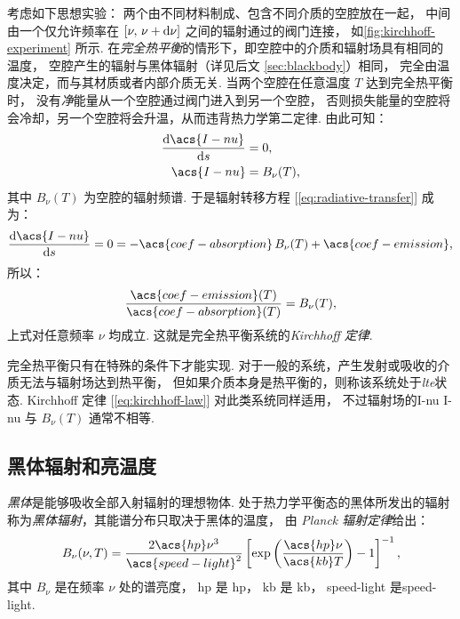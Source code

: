 考虑如下思想实验：
两个由不同材料制成、包含不同介质的空腔放在一起，
中间由一个仅允许频率在 $[\nu, \,\nu+\mathrm{d}\nu]$ 之间的辐射通过的阀门连接，
如\autoref{fig:kirchhoff-experiment} 所示.
在\emph{完全热平衡}的情形下，即空腔中的介质和辐射场具有相同的温度，
空腔产生的辐射与黑体辐射（详见后文 \autoref{sec:blackbody}）相同，
完全由温度决定，而与其材质或者内部介质无关.
当两个空腔在任意温度 $T$ 达到完全热平衡时，
没有\emph{净}能量从一个空腔通过阀门进入到另一个空腔，
否则损失能量的空腔将会冷却，另一个空腔将会升温，从而违背热力学第二定律.
由此可知：
\begin{align}
  \diff{\acs{I-nu}}{s} & = 0 , \\
  \acs{I-nu} & = B_{\nu}(T) ,
\end{align}
其中 $B_{\nu}(T)$ 为空腔的辐射频谱.
于是辐射转移方程 [\autoref{eq:radiative-transfer}] 成为：
\begin{equation}
  \diff{\acs{I-nu}}{s} = 0
    = - \acs{coef-absorption} \,B_{\nu}(T) + \acs{coef-emission} ,
\end{equation}
所以：
\begin{equation}
  \label{eq:kirchhoff-law}
  \frac{\acs{coef-emission}(T)}{\acs{coef-absorption}(T)} = B_{\nu}(T) ,
\end{equation}
上式对任意频率 $\nu$ 均成立.
这就是完全热平衡系统的\emph{Kirchhoff 定律}.

完全热平衡只有在特殊的条件下才能实现.
对于一般的系统，产生发射或吸收的介质无法与辐射场达到热平衡，
但如果介质本身是热平衡的，则称该系统处于\emph{\acf{lte}}状态.
Kirchhoff 定律 [\autoref{eq:kirchhoff-law}] 对此类系统同样适用，
不过辐射场的\acl{I-nu} \ac{I-nu} 与 $B_{\nu}(T)$ 通常不相等.

\subsection{黑体辐射和亮温度}
\label{sec:blackbody}

\emph{黑体}是能够吸收全部入射辐射的理想物体.
处于热力学平衡态的黑体所发出的辐射称为\emph{黑体辐射}，其能谱分布只取决于黑体的温度，
由 \emph{Planck 辐射定律}给出：
\begin{equation}
  \label{eq:planck}
  B_{\nu}(\nu, T) = \frac{2 \acs{hp} \nu^3}{\acs{speed-light}^2}
    \left[ \exp\left( \frac{\acs{hp} \nu}{\acs{kb} T} \right) - 1 \right]^{-1} ,
\end{equation}
其中 $B_{\nu}$ 是在频率 $\nu$ 处的谱亮度，
\acs{hp} 是 \acl{hp}，
\acs{kb} 是 \acl{kb}，
\acs{speed-light} 是\acl{speed-light}.

